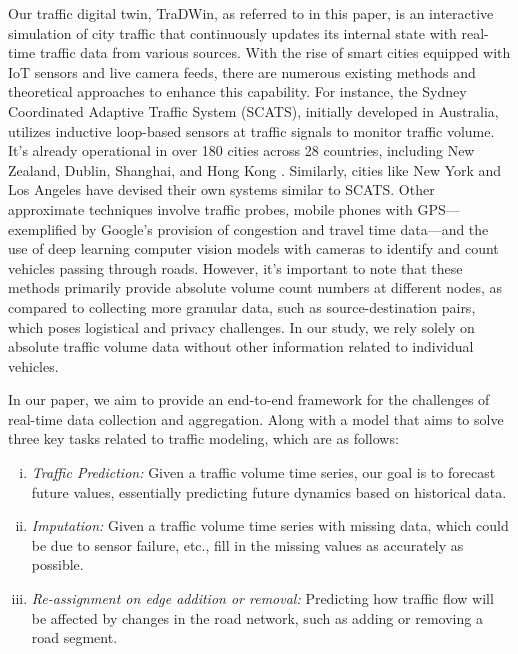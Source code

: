 \documentclass[conference]{IEEEtran}
\newcommand{\name}{TraDWin}
\begin{document}
Our traffic digital twin, \name, as referred to in this paper, is an interactive simulation of city traffic that continuously updates its internal state with real-time traffic data from various sources. With the rise of smart cities equipped with IoT sensors and live camera feeds, there are numerous existing methods and theoretical approaches to enhance this capability. For instance, the Sydney Coordinated Adaptive Traffic System (SCATS)\cite{scats}, initially developed in Australia, utilizes inductive loop-based sensors at traffic signals to monitor traffic volume. It's already operational in over 180 cities across 28 countries, including New Zealand, Dublin, Shanghai, and Hong Kong \cite{wiki:sydney_traffic_system}. Similarly, cities like New York and Los Angeles have devised their own systems similar to SCATS. Other approximate techniques involve traffic probes\cite{zhu2012probe}, mobile phones with GPS\cite{rose2006mobile}—exemplified by Google's provision of congestion and travel time data—and the use of deep learning computer vision models with cameras to identify and count vehicles passing through roads. However, it's important to note that these methods primarily provide absolute volume count numbers at different nodes, as compared to collecting more granular data, such as source-destination pairs, which poses logistical and privacy challenges. In our study, we rely solely on absolute traffic volume data without other information related to individual vehicles.

In our paper, we aim to provide an end-to-end framework for the challenges of real-time data collection and aggregation. Along with a model that aims to solve three key tasks related to traffic modeling, which are as follows:
\begin{enumerate}[(i)]
    \item \textit{Traffic Prediction:} Given a traffic volume time series, our goal is to forecast future values, essentially predicting future dynamics based on historical data.
    
    \item \textit{Imputation:} Given a traffic volume time series with missing data, which could be due to sensor failure, etc., fill in the missing values as accurately as possible.
    
    \item \textit{Re-assignment on edge addition or removal:} Predicting how traffic flow will be affected by changes in the road network, such as adding or removing a road segment.
\end{enumerate}
\end{document}
